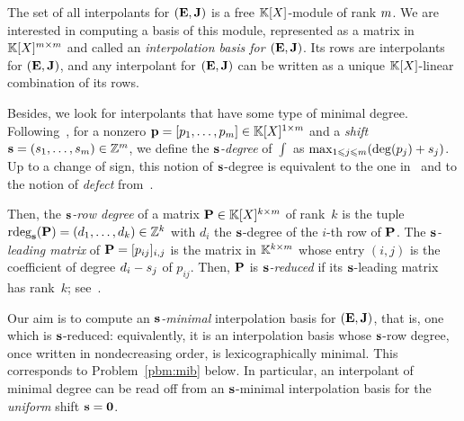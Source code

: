 \documentclass[preprint]{sig-alternate-05-2015}
\begin{document}
The set of all interpolants for $(\evMat,\mulmat)$ is a free $\mathbb{K}[X]$-module
of rank $m$. We are interested in computing a basis of this module,
represented as a matrix in $\intSpace$ and called an \emph{interpolation basis
for $(\evMat,\mulmat)$}. Its rows are interpolants for $(\evMat,\mulmat)$, and
any interpolant for $(\evMat,\mulmat)$ can be written as a unique
$\mathbb{K}[X]$-linear combination of its rows.

Besides, we look for interpolants that have some type of minimal degree.
Following~\cite{BarBul92,ZhoLab12}, for a nonzero $\int = [p_1,\ldots,p_\rdim]
\in \polMatSpace[1][\rdim]$ and a \emph{shift} $\mathbf{s} =
(s_{1},\ldots,s_{m}) \in \mathbb{Z}^{m}$, we define the
\emph{$\mathbf{s}$-degree} of $\int$ as $\max_{1\leqslant j\leqslant m} (\deg(p_j) +
s_{j})$. Up to a change of sign, this notion of $\mathbf{s}$-degree is
equivalent to the one in~\cite{BeLaVi06} and to the notion of \emph{defect}
from~\cite[Definition~3.1]{BecLab94}.

Then, the \emph{$\mathbf{s}$-row degree} of a matrix $\mat{P} \in
\polMatSpace[k][\rdim]$ of rank~$k$ is the tuple $\rdeg[\shifts]{\mat{P}} =
(d_1,\ldots,d_k) \in \shiftSpace[k]$ with $d_i$ the $\mathbf{s}$-degree of the
$i$-th row of $\mat{P}$. The \emph{$\mathbf{s}$-leading matrix} of $\mat{P} =
[p_{ij}]_{i,j}$ is the matrix in $\matSpace[k][\rdim]$ whose entry $(i,j)$ is
the coefficient of degree $d_i - s_{j}$ of $p_{ij}$.  Then, $\mat{P}$ is
\emph{$\mathbf{s}$-reduced} if its $\mathbf{s}$-leading matrix has rank~$k$;
see~\cite{BeLaVi06}.

Our aim is to compute an \emph{$\mathbf{s}$-minimal} interpolation basis for
$(\evMat,\mulmat)$, that is, one which is $\mathbf{s}$-reduced: equivalently, it
is an interpolation basis whose $\mathbf{s}$-row degree, once written in
nondecreasing order, is lexicographically minimal. This corresponds to
Problem~\ref{pbm:mib} below. In particular, an interpolant of minimal degree
can be read off from an $\mathbf{s}$-minimal interpolation basis for the
\emph{uniform} shift $\mathbf{s} = \mathbf{0}$.

\begin{center}
\end{center}
\end{document}
